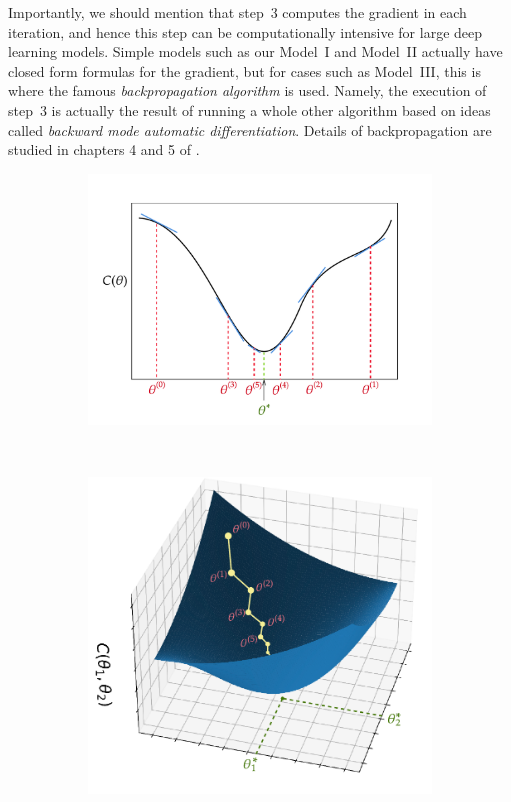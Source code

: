 \documentclass[12pt]{article}
\begin{document}
Importantly, we should mention that step~3 computes the gradient in each iteration, and hence this step can be computationally intensive for large deep learning models. Simple models such as our Model~I and Model~II actually have closed form formulas for the gradient, but for cases such as Model~III, this is where the famous {\em backpropagation algorithm} is used. Namely, the  execution of step~3 is actually the result of running a whole other algorithm based on ideas called {\em backward mode automatic differentiation}. Details of backpropagation are studied in chapters 4 and 5 of \cite{LiquetMokaNazarathy2024DeepLearning}.

\begin{figure}[h!] 
  \begin{subfigure}[b]{0.5\linewidth}
    \centering
    \includegraphics[width=0.99\linewidth, height=0.8\textwidth, trim=20 20 20 20]{figures/GD_1d.pdf}
    \caption{} 
    \vspace{2ex}
  \end{subfigure}%
  ~
  \begin{subfigure}[b]{0.5\linewidth}
    \centering
    \includegraphics[width=0.9\linewidth, trim=20 20 20 20]{figures/GD_2d.pdf}

\end{subfigure}
\end{figure}
\end{document}
